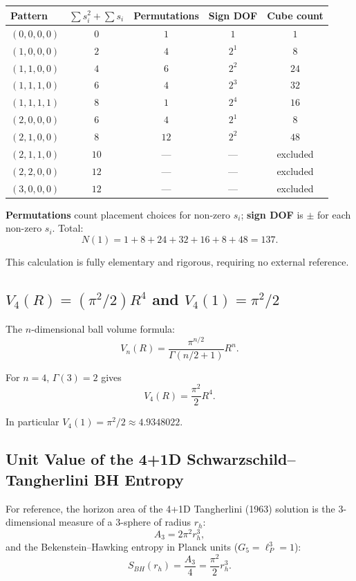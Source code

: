 \documentclass[a4paper,11pt]{article}
\begin{document}
\begin{center}
\begin{tabular}{lcccc}
\toprule
Pattern & $\sum s_i^2 + \sum s_i$ & Permutations & Sign DOF & Cube count \\
\midrule
$(0,0,0,0)$ & $0$ & $1$ & $1$ & $1$ \\
$(1,0,0,0)$ & $2$ & $4$ & $2^1$ & $8$ \\
$(1,1,0,0)$ & $4$ & $6$ & $2^2$ & $24$ \\
$(1,1,1,0)$ & $6$ & $4$ & $2^3$ & $32$ \\
$(1,1,1,1)$ & $8$ & $1$ & $2^4$ & $16$ \\
$(2,0,0,0)$ & $6$ & $4$ & $2^1$ & $8$ \\
$(2,1,0,0)$ & $8$ & $12$ & $2^2$ & $48$ \\
$(2,1,1,0)$ & $10$ & --- & --- & excluded \\
$(2,2,0,0)$ & $12$ & --- & --- & excluded \\
$(3,0,0,0)$ & $12$ & --- & --- & excluded \\
\bottomrule
\end{tabular}
\end{center}

\textbf{Permutations} count placement choices for non-zero $s_i$; \textbf{sign DOF} is $\pm$ for each non-zero $s_i$. Total:
\[ N(1) = 1 + 8 + 24 + 32 + 16 + 8 + 48 = \boxed{137}. \]

This calculation is fully elementary and rigorous, requiring no external reference.

\subsection{$V_4(R) = (\pi^2/2) R^4$ and $V_4(1) = \pi^2/2$}

The $n$-dimensional ball volume formula:
\[ V_n(R) = \frac{\pi^{n/2}}{\Gamma(n/2 + 1)} R^n. \]

For $n = 4$, $\Gamma(3) = 2$ gives
\[ V_4(R) = \frac{\pi^2}{2} R^4. \]

In particular $V_4(1) = \pi^2/2 \approx 4.9348022$.

\subsection{Unit Value of the 4+1D Schwarzschild--Tangherlini BH Entropy}

For reference, the horizon area of the 4+1D Tangherlini (1963) solution is the 3-dimensional measure of a 3-sphere of radius $r_h$:
\[ A_3 = 2\pi^2 r_h^3, \]
and the Bekenstein--Hawking entropy in Planck units ($G_5 = \ell_P^3 = 1$):
\[ S_{BH}(r_h) = \frac{A_3}{4} = \frac{\pi^2}{2} r_h^3. \]
\end{document}
